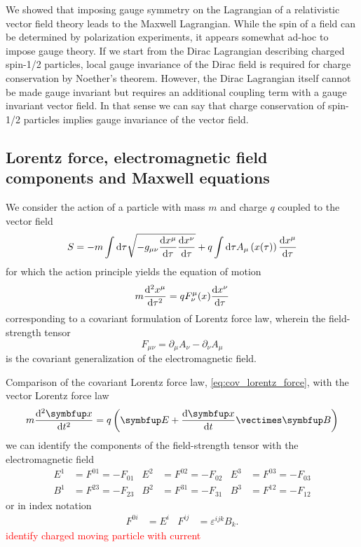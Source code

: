 We showed that imposing gauge symmetry on the Lagrangian of a relativistic vector field theory leads to the Maxwell Lagrangian.
While the spin of a field can be determined by polarization experiments, it appears somewhat ad-hoc to impose gauge theory.
If we start from the Dirac Lagrangian describing charged spin-1/2 particles, local gauge invariance of the Dirac field is required for charge conservation by Noether's theorem.
However, the Dirac Lagrangian itself cannot be made gauge invariant but requires an additional coupling term with a gauge invariant vector field.
In that sense we can say that charge conservation of spin-1/2 particles implies gauge invariance of the vector field.

\subsection{Lorentz force, electromagnetic field components and Maxwell equations}

We consider the action of a particle with mass $m$ and charge $q$ coupled to the vector field~\cite[p.~244]{Zee2013}
\begin{equation}
	S
	=
	-
	m\int\odif{\tau}
	\sqrt{-g_{\mu\nu}\odv{x^\mu}{\tau}\odv{x^\nu}{\tau}}
	+
	q\int\odif{\tau}
	A_\mu\left(x(\tau)\right)
	\odv{x^\mu}{\tau}
\end{equation}
for which the action principle yields the equation of motion
\begin{equation}
	m
	\odv[order={2}]{x^\mu}{\tau}
	=
	qF^\mu_\nu(x)\odv{x^\nu}{\tau}
	\label{eq:cov_lorentz_force}
\end{equation}
corresponding to a covariant formulation of Lorentz force law, wherein the field-strength tensor
\begin{equation}
	F_{\mu\nu}
	=
	\partial_\mu
	A_\nu
	-
	\partial_\nu
	A_\mu
\end{equation}
is the covariant generalization of the electromagnetic field.

Comparison of the covariant Lorentz force law, \cref{eq:cov_lorentz_force}, with the vector Lorentz force law
\begin{equation}
	m
	\odv[order={2}]{\vb{x}}{t}
	=
	q\left(
		\vb{E}
		+
		\odv{\vb{x}}{t}
		\vcross
		\vb{B}
	\right)
\end{equation}
we can identify the components of the field-strength tensor with the electromagnetic field~\cite[p.~245]{Zee2013}
\begin{align}
	E^1
	&=
	F^{01}
	=
	-
	F_{01}
	&
	E^2
	&=
	F^{02}
	=
	-
	F_{02}
	&
	E^3
	&=
	F^{03}
	=
	-
	F_{03}
	\\
	B^1
	&=
	F^{23}
	=
	-
	F_{23}
	&
	B^2
	&=
	F^{31}
	=
	-
	F_{31}
	&
	B^3
	&=
	F^{12}
	=
	-
	F_{12}
\end{align}
or in index notation~\cite[p.~336]{Srednicki2007}
\begin{align}
	F^{0i}
	&=
	E^i
	&
	F^{ij}
	&=
	\varepsilon^{ijk}
	B_k
	.
\end{align}
\textcolor{red}{identify charged moving particle with current}

